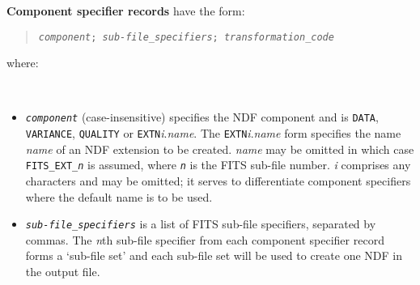 \documentclass[twoside,11pt]{article}
\newcommand{\latex}[1]{#1}
\newcommand{\ssthitemlist}[1]{
  \latex{
  \mbox{} \\
  \vspace{-3.5ex}
  }
  \begin{itemize}
     #1
  \end{itemize}
}
\newcommand{\sstitem}{\item}
\newcommand{\sstitem}{\item}
\begin{document}
{{{        \textbf{Component specifier records} have the form:
        \begin{quote}
          \texttt{\textit{component}; \textit{sub-file\_specifiers};
          \textit{transformation\_code}}
        \end{quote}
        where:
           \ssthitemlist{
           \sstitem
           \texttt{\textit{component}} (case-insensitive) specifies the NDF
              component and is \texttt{DATA}, \texttt{VARIANCE}, \texttt{QUALITY} or
              \texttt{EXTN}\textit{i}.\textit{name}. The \texttt{EXTN}\textit{i}.\textit{name}
              form specifies the name \textit{name} of an NDF extension to be
              created. \textit{name} may be omitted in which case 
              \texttt{FITS\_EXT\_\textit{n}} is assumed, where
              \texttt{\textit{n}} is the FITS sub-file number.
              \textit{i} comprises any characters and may be omitted; it serves to
              differentiate component specifiers where the default name is to
              be used.
           \sstitem
           \texttt{\textit{sub-file\_specifiers}} is a list of FITS sub-file
              specifiers, separated by commas. The \textit{n}th sub-file
              specifier from each component specifier record forms a
              `sub-file set' and each
              sub-file set will be used to create one NDF in the output
              file.

}}}}
\end{document}
